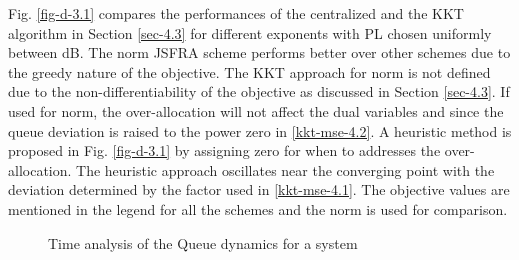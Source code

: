 Fig. \ref{fig-d-3.1} compares the performances of the centralized and the \ac{KKT} algorithm in Section \ref{sec-4.3} for different exponents with \ac{PL} chosen uniformly between \me{[0,-3]} dB. The  norm \ac{JSFRA} scheme performs better over other schemes due to the greedy nature of the objective. The \ac{KKT} approach for  norm is not defined due to the non-differentiability of the objective as discussed in Section \ref{sec-4.3}. If used for  norm, the over-allocation will not affect the dual variables  and  since the queue deviation is raised to the power zero in \eqref{kkt-mse-4.2}. A heuristic method is proposed in Fig. \ref{fig-d-3.1} by assigning zero for  when  to addresses the over-allocation. The heuristic approach oscillates near the converging point with the deviation determined by the factor \me{\rho} used in \eqref{kkt-mse-4.1}. The objective values are mentioned in the legend for all the schemes and the  norm is used for comparison.
\begin{figure*}
	\centering
	\hfill
	\caption{Time analysis of the Queue dynamics for a system }
	\label{fig-time-analysis}
\end{figure*}

